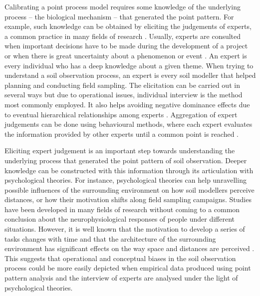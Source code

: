 Calibrating a point process model requires some knowledge of the underlying process -- the biological 
mechanism -- that generated the point pattern. For example, such knowledge can be obtained by eliciting the 
judgements of experts, a common practice in many fields of research \cite{OHaganEtAl2006}. Usually, experts 
are consulted when important decisions have to be made during the development of a project or when there is 
great uncertainty about a phenomenon or event \cite{MeyerEtAl2001}. An expert is every individual who has a 
deep knowledge about a given theme. When trying to understand a soil observation process, an expert is every 
soil modeller that helped planning and conducting field sampling. The elicitation can be carried out in several 
ways \cite{Cooke1991, MeyerEtAl2001, OHaganEtAl2006} but due to operational issues, individual interview is the 
method most commonly employed. It also helps avoiding negative dominance effects due to eventual hierarchical 
relationships among experts \cite{Cooke1991}. Aggregation of expert judgements can be done using behavioural 
methods, where each expert evaluates the information provided by other experts until a common point is reached 
\cite{OrsiEtAl2011}.

Eliciting expert judgement is an important step towards understanding the underlying process that generated 
the point pattern of soil observation. Deeper knowledge can be constructed with this information through its 
articulation with psychological theories. For instance, psychological theories can help unravelling possible 
influences of the surrounding environment on how soil modellers perceive distances, or how their motivation 
shifts along field sampling campaigns. Studies have been developed in many fields of research \cite{Hull1932, 
BonnesEtAl2002, StampsEtAl2004, BonezziEtAl2011, Toure-TilleryEtAl2011a} without coming to a common conclusion 
about the neurophysiological responses of people under different situations. However, it is well known that the 
motivation to develop a series of tasks changes with time \cite{BonezziEtAl2011, Toure-TilleryEtAl2011a} and 
that the architecture of the surrounding environment has significant effects on the way space and distances are 
perceived \cite{Coeterier1994, EpsteinEtAl1998}. This suggests that operational and conceptual biases in the 
soil observation process could be more easily depicted when empirical data produced using point pattern 
analysis and the interview of experts are analysed under the light of psychological theories.

